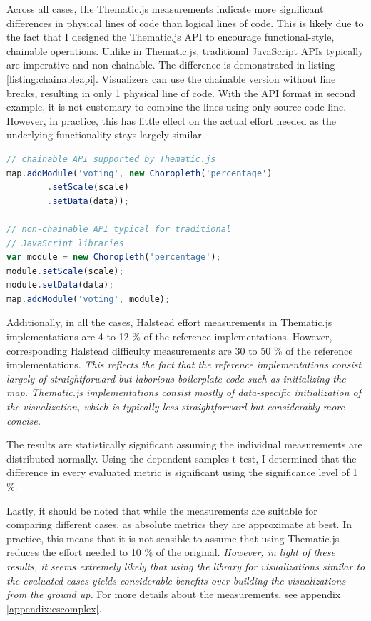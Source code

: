Across all cases, the Thematic.js measurements indicate more significant differences in physical lines of code than logical lines of code. This is likely due to the fact that I designed the Thematic.js API to encourage functional-style, chainable operations. Unlike in Thematic.js, traditional JavaScript APIs typically are imperative and non-chainable. The difference is demonstrated in listing \ref{listing:chainableapi}. Visualizers can use the chainable version without line breaks, resulting in only 1 physical line of code. With the API format in second example, it is not customary to combine the lines using only source code line. However, in practice, this has little effect on the actual effort needed as the underlying functionality stays largely similar.

\begin{lstlisting}[caption=Thematic.js API format. The code has been simplified to increase readability.,language=JavaScript,label=listing:chainableapi]
// chainable API supported by Thematic.js
map.addModule('voting', new Choropleth('percentage')
        .setScale(scale)
        .setData(data));

// non-chainable API typical for traditional
// JavaScript libraries
var module = new Choropleth('percentage');
module.setScale(scale);
module.setData(data);
map.addModule('voting', module);
\end{lstlisting}

Additionally, in all the cases, Halstead effort measurements in Thematic.js implementations are 4 to 12 \% of the reference implementations. However, corresponding Halstead difficulty measurements are 30 to 50 \% of the reference implementations. \emph{This reflects the fact that the reference implementations consist largely of straightforward but laborious boilerplate code such as initializing the map. Thematic.js implementations consist mostly of data-specific initialization of the visualization, which is typically less straightforward but considerably more concise.}

The results are statistically significant assuming the individual measurements are distributed normally. Using the dependent samples t-test, I determined that the difference in every evaluated metric is significant using the significance level of 1 \%.

Lastly, it should be noted that while the measurements are suitable for comparing different cases, as absolute metrics they are approximate at best. In practice, this means that it is not sensible to assume that using Thematic.js reduces the effort needed to 10 \% of the original. \emph{However, in light of these results, it seems extremely likely that using the library for visualizations similar to the evaluated cases yields considerable benefits over building the visualizations from the ground up.} For more details about the measurements, see appendix \ref{appendix:escomplex}.

